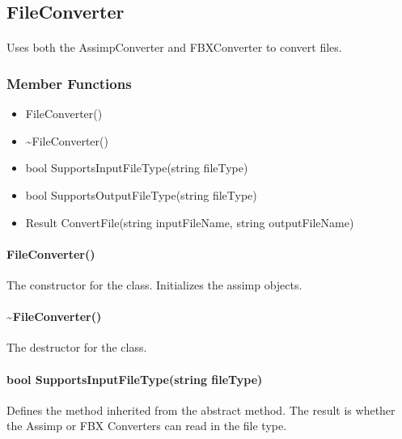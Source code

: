 \hypertarget{fileconversion_fileconverter}
{
    \label{fileconversion_fileconverter}
}

\subsection{FileConverter}
    \paragraph{}
        Uses both the AssimpConverter and FBXConverter to convert files.

    \subsubsection{Member Functions}

        \begin{itemize}
            \item FileConverter()
            \item \textasciitilde FileConverter()
            \item bool SupportsInputFileType(string fileType)
            \item bool SupportsOutputFileType(string fileType)
            \item Result ConvertFile(string inputFileName, string outputFileName)
        \end{itemize}

        \paragraph{FileConverter()}
            \hfill \break
            The constructor for the class. Initializes the assimp objects.   
        
        \paragraph{\textasciitilde FileConverter()}
            \hfill \break
            The destructor for the class.

        \paragraph{bool SupportsInputFileType(string fileType)}
            \hfill \break
            Defines the method inherited from the abstract method.  The result is whether the Assimp or FBX Converters can read in the file type.

